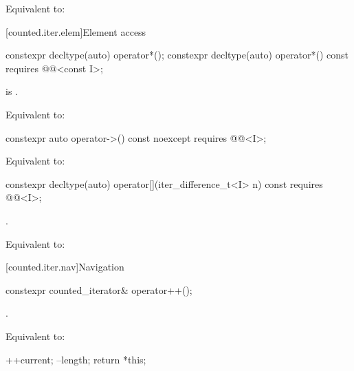 \begin{itemdescr}
\pnum
\effects
Equivalent to: 
\end{itemdescr}

[counted.iter.elem]{Element access}

%
\begin{itemdecl}
constexpr decltype(auto) operator*();
constexpr decltype(auto) operator*() const
  requires @@<const I>;
\end{itemdecl}

\begin{itemdescr}
\pnum
\expects
{} is .

\pnum
\effects
Equivalent to: 
\end{itemdescr}

%
\begin{itemdecl}
constexpr auto operator->() const noexcept
  requires @@<I>;
\end{itemdecl}

\begin{itemdescr}
\pnum
\effects
Equivalent to: 
\end{itemdescr}

%
\begin{itemdecl}
constexpr decltype(auto) operator[](iter_difference_t<I> n) const
  requires @@<I>;
\end{itemdecl}

\begin{itemdescr}
\pnum
\expects
{}.

\pnum
\effects
Equivalent to: 
\end{itemdescr}

[counted.iter.nav]{Navigation}

%
\begin{itemdecl}
constexpr counted_iterator& operator++();
\end{itemdecl}

\begin{itemdescr}
\pnum
\expects
{}.

\pnum
\effects
Equivalent to:
\begin{codeblock}
++current;
--length;
return *this;
\end{codeblock}
\end{itemdescr}

